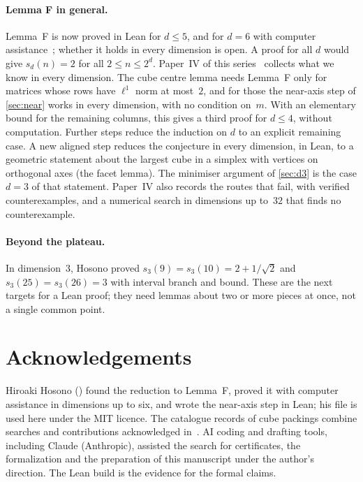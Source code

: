 \documentclass[11pt,a4paper]{article}
\begin{document}
\paragraph{Lemma F in general.} Lemma~F is now proved in Lean for $d\le5$, and for $d=6$ with computer assistance~\cite{hosono}; whether it holds in every dimension is open. A proof for all $d$ would give $s_d(n)=2$ for all $2\le n\le 2^d$. Paper~IV of this series~\cite{alldims} collects what we know in every dimension. The cube centre lemma needs Lemma~F only for matrices whose rows have $\ell^1$ norm at most~$2$, and for those the near-axis step of \cref{sec:near} works in every dimension, with no condition on~$m$. With an elementary bound for the remaining columns, this gives a third proof for $d\le4$, without computation. Further steps reduce the induction on $d$ to an explicit remaining case. A new aligned step reduces the conjecture in every dimension, in Lean, to a geometric statement about the largest cube in a simplex with vertices on orthogonal axes (the facet lemma). The minimiser argument of \cref{sec:d3} is the case $d=3$ of that statement. Paper~IV also records the routes that fail, with verified counterexamples, and a numerical search in dimensions up to~$32$ that finds no counterexample.

\paragraph{Beyond the plateau.} In dimension~3, Hosono proved $s_3(9)=s_3(10)=2+1/\sqrt2$ and $s_3(25)=s_3(26)=3$ with interval branch and bound. These are the next targets for a Lean proof; they need lemmas about two or more pieces at once, not a single common point.

\section*{Acknowledgements}
Hiroaki Hosono () found the reduction to Lemma~F, proved it with computer assistance in dimensions up to six, and wrote the near-axis step in Lean; his file is used here under the MIT licence. The catalogue records of cube packings combine searches and contributions acknowledged in~\cite{archive}. AI coding and drafting tools, including Claude (Anthropic), assisted the search for certificates, the formalization and the preparation of this manuscript under the author's direction. The Lean build is the evidence for the formal claims.
\end{document}
